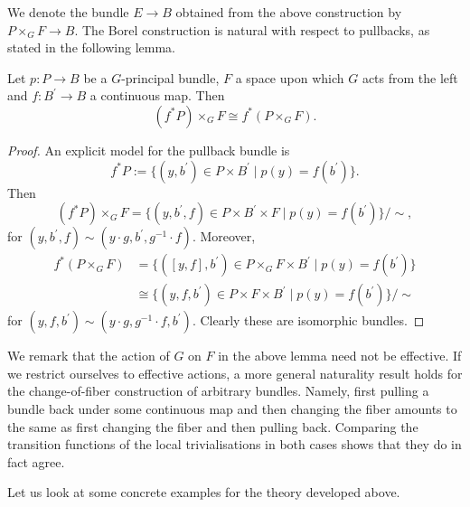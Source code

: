 We denote the bundle $E \to B$ obtained from the above construction by $P \times_G F \to B$. The Borel construction is natural with respect to pullbacks, as stated in the following lemma.

\begin{lemma}
        \label{bundles:lem:natruality_of_changing_fiber}
        Let $p \colon P \to B$ be a $G$-principal bundle, $F$ a space upon which $G$ acts from the left and $f \colon B^\prime \to B$ a continuous map. Then 
        \[
        (f^\ast P) \times_G F \cong f^\ast(P \times_G F).
        \]
\end{lemma}

\begin{proof}
    An explicit model for the pullback bundle is 
    \[
    f^\ast P := \{(y,b^\prime) \in P \times B^\prime \mid p(y) = f(b^\prime)\}.
    \]
    Then 
    \[
    (f^\ast P) \times_G F = \{(y,b^\prime,f) \in P \times B^\prime \times F \mid p(y) = f(b^\prime)\} / \sim,
    \]
    for $(y, b^\prime, f) \sim (y \cdot g, b^\prime, g^{-1} \cdot f)$. Moreover, 
    \begin{align*}
    f^\ast(P \times_G F) & = \{([y,f],b^\prime) \in P \times_G F \times B^\prime \mid p(y) = f(b^\prime)\} \\
    & \cong \{(y,f,b^\prime) \in P \times F \times B^\prime \mid p(y) = f(b^\prime)\} / \sim
    \end{align*}
    for $(y,f,b^\prime) \sim (y \cdot g, g^{-1} \cdot f, b^\prime)$. Clearly these are isomorphic bundles.
\end{proof}

\begin{remark}
    \label{bundles:rem:naturality_change_of_fiber}
    We remark that the action of $G$ on $F$ in the above lemma need not be effective. If we restrict ourselves to effective actions, a more general naturality result holds for the change-of-fiber construction of arbitrary bundles. Namely, first pulling a bundle back under some continuous map and then changing the fiber amounts to the same as first changing the fiber and then pulling back. Comparing the transition functions of the local trivialisations in both cases shows that they do in fact agree.
\end{remark}

Let us look at some concrete examples for the theory developed above.

